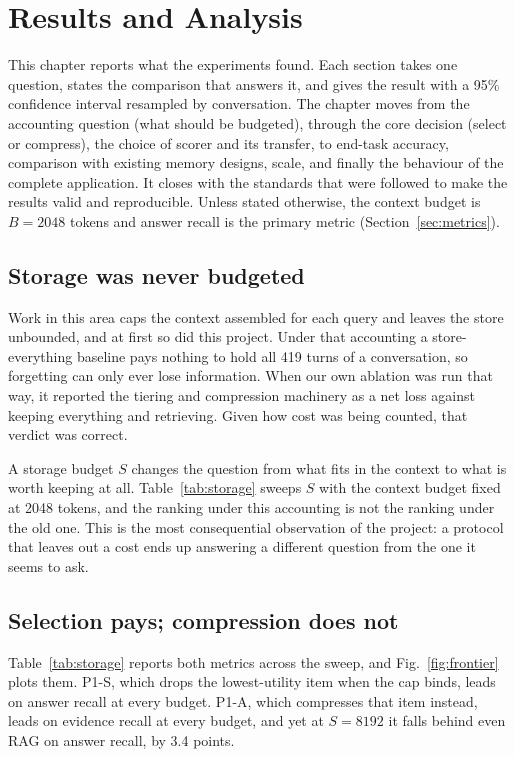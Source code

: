 \chapter{Results and Analysis}
\label{ch:results}

This chapter reports what the experiments found. Each section takes one
question, states the comparison that answers it, and gives the result with a
95\% confidence interval resampled by conversation. The chapter moves from the
accounting question (what should be budgeted), through the core decision
(select or compress), the choice of scorer and its transfer, to end-task
accuracy, comparison with existing memory designs, scale, and finally the
behaviour of the complete application. It closes with the standards that were
followed to make the results valid and reproducible. Unless stated otherwise,
the context budget is $B=2048$ tokens and answer recall is the primary metric
(Section~\ref{sec:metrics}).

\section{Storage was never budgeted}
\label{sec:accounting}

Work in this area caps the context assembled for each query and leaves the
store unbounded, and at first so did this project. Under that accounting a
store-everything baseline pays nothing to hold all 419 turns of a
conversation, so forgetting can only ever lose information. When our own
ablation was run that way, it reported the tiering and compression machinery
as a net loss against keeping everything and retrieving. Given how cost was
being counted, that verdict was correct.

A storage budget $S$ changes the question from what fits in the context to
what is worth keeping at all. Table~\ref{tab:storage} sweeps $S$ with the
context budget fixed at 2048 tokens, and the ranking under this accounting is
not the ranking under the old one. This is the most consequential observation
of the project: a protocol that leaves out a cost ends up answering a
different question from the one it seems to ask.

\section{Selection pays; compression does not}
\label{sec:selection}

Table~\ref{tab:storage} reports both metrics across the sweep, and
Fig.~\ref{fig:frontier} plots them. P1-S, which drops the lowest-utility item
when the cap binds, leads on answer recall at every budget. P1-A, which
compresses that item instead, leads on evidence recall at every budget, and
yet at $S=8192$ it falls behind even RAG on answer recall, by 3.4 points.

